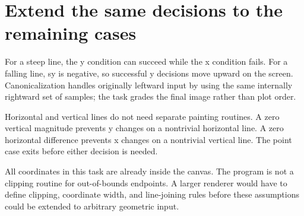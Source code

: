\section{Extend the same decisions to the remaining
  cases}\label{007-bresenham-line-p10-extend-the-same-decisions-to-the-remaining-cases}

For a steep line, the y condition can succeed while the x condition
fails. For a falling line, sy is negative, so successful y decisions
move upward on the screen. Canonicalization handles originally leftward
input by using the same internally rightward set of samples; the task
grades the final image rather than plot order.

Horizontal and vertical lines do not need separate painting routines. A
zero vertical magnitude prevents y changes on a nontrivial horizontal
line. A zero horizontal difference prevents x changes on a nontrivial
vertical line. The point case exits before either decision is needed.

All coordinates in this task are already inside the canvas. The program
is not a clipping routine for out-of-bounds endpoints. A larger renderer
would have to define clipping, coordinate width, and line-joining rules
before these assumptions could be extended to arbitrary geometric input.

